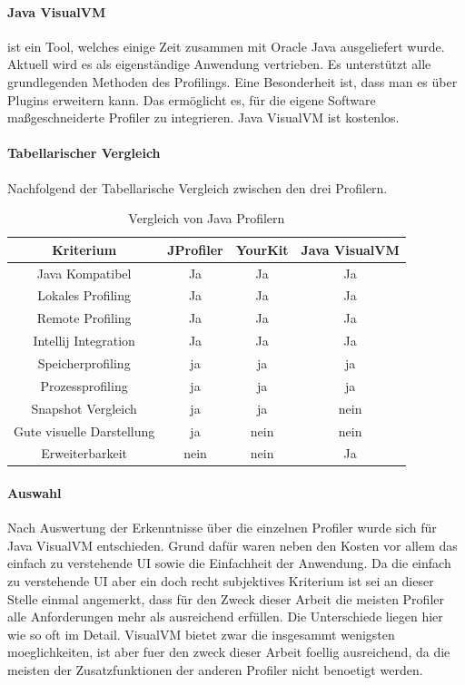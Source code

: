 \documentclass{article}
\begin{document}
\paragraph{Java VisualVM}

ist ein Tool, welches einige Zeit zusammen mit Oracle Java ausgeliefert wurde. ~\cite{WEBSITE:5} Aktuell wird es als eigenständige Anwendung vertrieben. Es unterstützt alle grundlegenden Methoden des Profilings. Eine Besonderheit ist, dass man es über Plugins erweitern kann. Das ermöglicht es, für die eigene Software maßgeschneiderte Profiler zu integrieren. Java VisualVM ist kostenlos.

\paragraph{Tabellarischer Vergleich}

Nachfolgend der Tabellarische Vergleich zwischen den drei Profilern. 
\begin{table}[h]
  \centering
  \caption{Vergleich von Java Profilern}
  \begin{tabular}{cccc}
    Kriterium & JProfiler & YourKit & Java VisualVM\\
    \hline
    Java Kompatibel & Ja& Ja & Ja\\
    Lokales Profiling &Ja&Ja&Ja\\
    Remote Profiling&Ja&Ja&Ja\\
    Intellij Integration&Ja&Ja&Ja\\
    Speicherprofiling&ja&ja&ja\\
    Prozessprofiling&ja&ja&ja\\
    Snapshot Vergleich&ja&ja&nein\\
    Gute visuelle Darstellung &ja&nein&nein\\
    Erweiterbarkeit&nein&nein&Ja
  \end{tabular}
  \label{tab:1}
\end{table}

\paragraph{Auswahl}
Nach Auswertung der Erkenntnisse über die einzelnen Profiler wurde sich für Java VisualVM entschieden.  Grund dafür waren neben den Kosten vor allem das einfach zu verstehende UI sowie die Einfachheit der Anwendung. Da die einfach zu verstehende UI aber ein doch recht subjektives Kriterium ist sei an dieser Stelle einmal angemerkt, dass für den Zweck dieser Arbeit die meisten Profiler alle Anforderungen mehr als ausreichend erfüllen. Die Unterschiede liegen hier wie so oft im Detail. VisualVM bietet zwar die insgesammt wenigsten moeglichkeiten, ist aber fuer den zweck dieser Arbeit foellig ausreichend, da die meisten der Zusatzfunktionen der anderen Profiler nicht benoetigt werden. 
\end{document}
